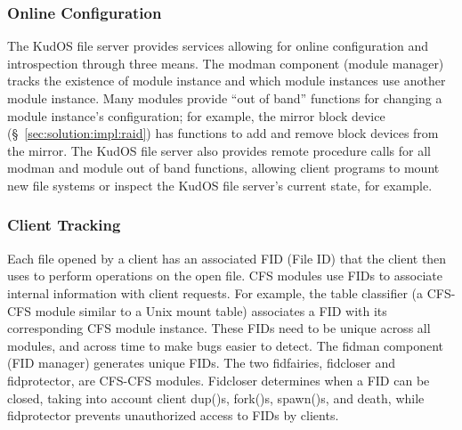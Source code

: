 \subsubsection{Online Configuration}
\label{sec:solution:arch:online}


The KudOS file server provides services allowing for online configuration
and introspection through three means. The modman component (module
manager) tracks the existence of module instance and which module instances
use another module instance. Many modules provide ``out of band'' functions
for changing a module instance's configuration; for example, the mirror
block device (\S~\ref{sec:solution:impl:raid}) has functions to add and
remove block devices from the mirror. The KudOS file server also provides
remote procedure calls for all modman and module out of band functions,
allowing client programs to mount new file systems or inspect the KudOS
file server's current state, for example.

\subsubsection{Client Tracking}
\label{sec:solution:arch:clients}

Each file opened by a client has an associated FID (File ID) that the client
then uses to perform operations on the open file. CFS modules use FIDs to
associate internal information with client requests. For example, the table
classifier (a CFS-CFS module similar to a Unix mount table) associates a FID
with its corresponding CFS module instance. These FIDs need to be unique across
all modules, and across time to make bugs easier to detect. The fidman component
(FID manager) generates unique FIDs. The two fidfairies, fidcloser and
fidprotector, are CFS-CFS modules. Fidcloser determines when a FID can be
closed, taking into account client dup()s, fork()s, spawn()s, and death, while
fidprotector prevents unauthorized access to FIDs by clients.
